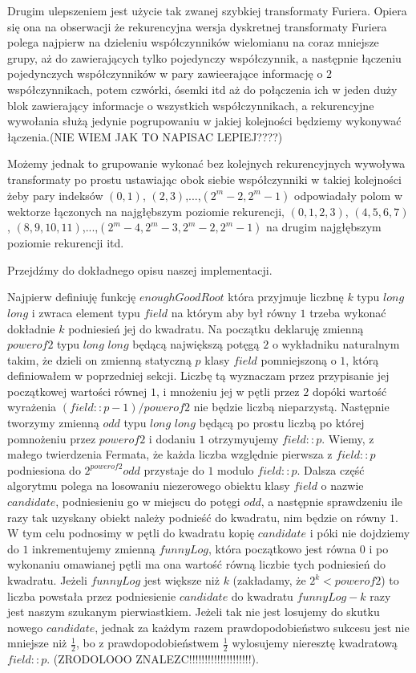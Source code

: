 \documentclass{article}
\begin{document}
Drugim ulepszeniem jest użycie tak zwanej szybkiej transformaty Furiera. Opiera się ona na obserwacji że rekurencyjna wersja dyskretnej transformaty Furiera 
polega najpierw na dzieleniu współczynników wielomianu na coraz mniejsze grupy, aż do zawierających tylko pojedynczy współczynnik, a następnie łączeniu pojedynczych współczynników
w pary zawieerające informację o $2$ współczynnikach, potem czwórki, ósemki itd aż do połączenia ich w jeden duży blok zawierający informacje o wszystkich współczynnikach, a rekurencyjne wywołania służą jedynie 
pogrupowaniu w jakiej kolejności będziemy wykonywać łączenia.(NIE WIEM JAK TO NAPISAC LEPIEJ????)
 
Możemy jednak to grupowanie wykonać bez kolejnych rekurencyjnych wywoływa transformaty po prostu ustawiając obok siebie współczynniki w takiej kolejności 
żeby pary indeksów $(0,1)$, $(2,3)$,...,$(2^m-2,2^m-1)$ odpowiadały polom w wektorze łączonych na najgłębszym poziomie rekurencji, $(0,1,2,3)$,
$(4,5,6,7)$, $(8,9,10,11)$,...,$(2^m-4,2^m-3,2^m-2,2^m-1)$ na drugim najgłębszym poziomie rekurencji itd. 

Przejdźmy do dokładnego opisu naszej implementacji. 

Najpierw definiuję funkcję $enoughGoodRoot$ która przyjmuje liczbnę $k$ typu $long$ $long$ i zwraca element typu $field$ na którym aby był równy 
$1$ trzeba wykonać dokładnie $k$ podniesień jej do kwadratu. Na początku deklaruję zmienną $powerof2$ typu $long$ $long$ będącą
największą potęgą $2$ o wykładniku naturalnym takim, że dzieli on zmienną statyczną $p$ klasy $field$ pomniejszoną o $1$, którą definiowałem
w poprzedniej sekcji. Liczbę tą wyznaczam przez przypisanie jej początkowej wartości równej $1$, i mnożeniu jej w pętli przez $2$
dopóki wartość wyrażenia $(field::p-1)/powerof2$ nie będzie liczbą nieparzystą. Następnie tworzymy zmienną $odd$ typu $long$ $long$ będącą po 
prostu liczbą po której pomnożeniu przez $powerof2$ i dodaniu $1$ otrzymyujemy $field::p$. Wiemy, z małego twierdzenia Fermata, że każda liczba względnie 
pierwsza z $field::p$ podniesiona do $2^{powerof2}odd$ przystaje do $1$ modulo $field::p$. Dalsza część algorytmu polega na losowaniu niezerowego obiektu klasy $field$ o nazwie $candidate$,
podniesieniu go w miejscu do potęgi $odd$, a następnie sprawdzeniu ile razy tak uzyskany obiekt należy podnieść do kwadratu, nim będzie on równy $1$. W tym celu podnosimy w pętli do kwadratu
kopię $candidate$ i póki nie dojdziemy do $1$ inkrementujemy zmienną $funnyLog$, która początkowo jest równa $0$ i po wykonaniu omawianej pętli ma ona wartość równą liczbie tych podniesień do kwadratu. Jeżeli $funnyLog$ jest większe niż $k$ (zakładamy, że $2^k<powerof2$) to liczba powstała przez podniesienie $candidate$ do kwadratu $funnyLog-k$ razy
jest naszym szukanym pierwiastkiem. Jeżeli tak nie jest losujemy do skutku nowego $candidate$, jednak za każdym razem prawdopodobieństwo
sukcesu jest nie mniejsze niż $\frac{1}{2}$, bo z prawdopodobieństwem $\frac{1}{2}$ wylosujemy nieresztę kwadratową $field::p$. (ZRODOLOOO ZNALEZC!!!!!!!!!!!!!!!!!!!!).
\end{document}
